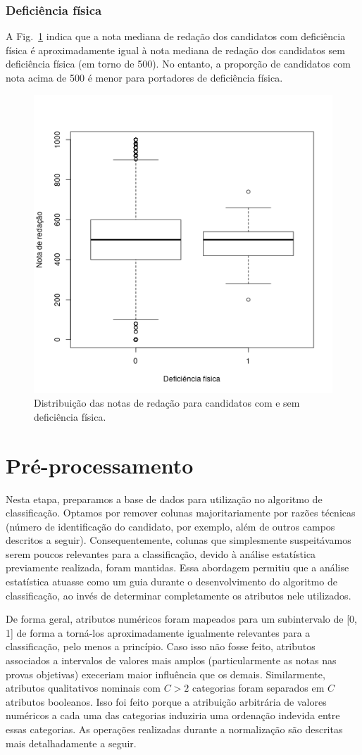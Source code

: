 \documentclass[12pt]{article}
\newcommand{\reffig}[1]{Fig.~\ref{fig:#1}}
\begin{document}
\subsubsection{Deficiência física}
A \reffig{correlacao-deficiencia-fisica} indica que a nota mediana de redação dos candidatos com deficiência física é aproximadamente igual à nota mediana de redação dos candidatos sem deficiência física (em torno de 500).
No entanto, a proporção de candidatos com nota acima de 500 é menor para portadores de deficiência física.
\begin{figure}[H]
\centering\includegraphics[width=.5\linewidth]{../correlacao_deficiencia_fisica.png}
\caption{Distribuição das notas de redação para candidatos com e sem deficiência física.}
\label{fig:correlacao-deficiencia-fisica}
\end{figure}

\section{Pré-processamento}
\label{sec:pre-processamento}
Nesta etapa, preparamos a base de dados para utilização no algoritmo de classificação.
Optamos por remover colunas majoritariamente por razões técnicas (número de identificação do candidato, por exemplo, além de outros campos descritos a seguir). Consequentemente, colunas que simplesmente suspeitávamos serem poucos relevantes para a classificação, devido à análise estatística previamente realizada, foram mantidas.
Essa abordagem permitiu que a análise estatística atuasse como um guia durante o desenvolvimento do algoritmo de classificação, ao invés de determinar completamente os atributos nele utilizados.

De forma geral, atributos numéricos foram mapeados para um subintervalo de [0, 1] de forma a torná-los aproximadamente igualmente relevantes para a classificação, pelo menos a princípio.
Caso isso não fosse feito, atributos associados a intervalos de valores mais amplos (particularmente as notas nas provas objetivas) execeriam maior influência que os demais.
Similarmente, atributos qualitativos nominais com $C > 2$ categorias foram separados em $C$ atributos booleanos.
Isso foi feito porque a atribuição arbitrária de valores numéricos a cada uma das categorias induziria uma ordenação indevida entre essas categorias.
As operações realizadas durante a normalização são descritas mais detalhadamente a seguir.
\end{document}
